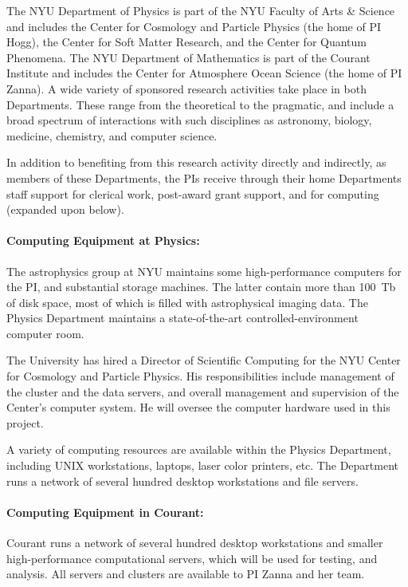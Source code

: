 The NYU Department of Physics is part of the NYU Faculty of Arts \& Science and includes the Center for Cosmology and Particle Physics (the home of PI Hogg), the Center for Soft Matter Research, and the Center for Quantum Phenomena.
The NYU Department of Mathematics is part of the Courant Institute and includes the Center for Atmosphere Ocean Science (the home of PI Zanna).
A wide variety of sponsored
research activities take place in both Departments.
These range from
the theoretical to the pragmatic, and include a broad spectrum of
interactions with such disciplines as astronomy, biology, medicine, chemistry, and computer science.

In addition to benefiting from this research activity directly and indirectly, as members of these Departments, the PIs receive through their home Departments staff support for clerical work, post-award grant support, and for computing (expanded upon below).

\paragraph{Computing Equipment at Physics:}
The astrophysics group at NYU maintains some high-performance computers
for the PI, and substantial storage machines.
The latter contain more than 100~Tb of disk space, most of which is filled
with astrophysical imaging data.  The Physics Department maintains a
state-of-the-art controlled-environment computer room.

The University has hired a Director of Scientific Computing for the
NYU Center for Cosmology and Particle Physics.  His
responsibilities include management of the cluster and the data
servers, and overall management and supervision of the Center's
computer system.  He will oversee the computer hardware used in this
project.

A variety of computing resources are available within the Physics
Department, including UNIX workstations, laptops, laser color
printers, etc.  The Department runs a network of several hundred
desktop workstations and file servers.

\paragraph{Computing Equipment in Courant:}
Courant runs a network of several hundred desktop workstations and smaller high-performance computational servers, which will be used for testing, and analysis. All servers and
clusters are available to PI Zanna and her team.

